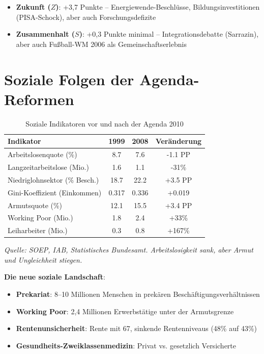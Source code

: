 \begin{itemize}
    \item \textbf{Zukunft (\(Z\))}: +3,7 Punkte – Energiewende-Beschlüsse, Bildungsinvestitionen (PISA-Schock), aber auch Forschungsdefizite
    \item \textbf{Zusammenhalt (\(S\))}: +0,3 Punkte minimal – Integrationsdebatte (Sarrazin), aber auch Fußball-WM 2006 als Gemeinschaftserlebnis
\end{itemize}

\section{Soziale Folgen der Agenda-Reformen}

\begin{table}[ht]
    \centering
    \caption{Soziale Indikatoren vor und nach der Agenda 2010}
    \label{tab:sozial_agenda}
    \begin{tabular}{lccc}
        \toprule
        \textbf{Indikator} & \textbf{1999} & \textbf{2008} & \textbf{Veränderung} \\
        \midrule
        Arbeitslosenquote (\%) & 8.7 & 7.6 & -1.1 PP \\
        Langzeitarbeitslose (Mio.) & 1.6 & 1.1 & -31\% \\
        Niedriglohnsektor (\% Besch.) & 18.7 & 22.2 & +3.5 PP \\
        Gini-Koeffizient (Einkommen) & 0.317 & 0.336 & +0.019 \\
        Armutsquote (\%) & 12.1 & 15.5 & +3.4 PP \\
        Working Poor (Mio.) & 1.8 & 2.4 & +33\% \\
        Leiharbeiter (Mio.) & 0.3 & 0.8 & +167\% \\
        \bottomrule
    \end{tabular}
\end{table}

\begin{flushleft}
\footnotesize{\textit{Quelle: SOEP, IAB, Statistisches Bundesamt. Arbeitslosigkeit sank, aber Armut und Ungleichheit stiegen.}}
\end{flushleft}

\textbf{Die neue soziale Landschaft}:

\begin{itemize}
    \item \textbf{Prekariat}: 8–10 Millionen Menschen in prekären Beschäftigungsverhältnissen
    \item \textbf{Working Poor}: 2,4 Millionen Erwerbstätige unter der Armutsgrenze
    \item \textbf{Rentenunsicherheit}: Rente mit 67, sinkende Rentenniveaus (48\% auf 43\%)
    \item \textbf{Gesundheits-Zweiklassenmedizin}: Privat vs. gesetzlich Versicherte
\end{itemize}

